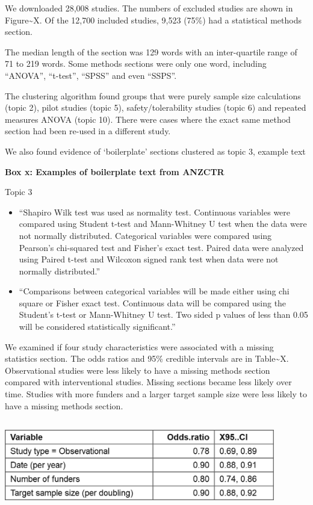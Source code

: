 \documentclass[12pt]{article}
\providecommand{\tightlist}{%
  \setlength{\itemsep}{0pt}\setlength{\parskip}{0pt}}
\begin{document}
We downloaded 28,008 studies. The numbers of excluded studies are shown
in Figure\textasciitilde X. Of the 12,700 included studies, 9,523 (75\%)
had a statistical methods section.

The median length of the section was 129 words with an inter-quartile
range of 71 to 219 words. Some methods sections were only one word,
including ``ANOVA'', ``t-test'', ``SPSS'' and even ``SSPS''.

The clustering algorithm found groups that were purely sample size
calculations (topic 2), pilot studies (topic 5), safety/tolerability
studies (topic 6) and repeated measures ANOVA (topic 10). There were
cases where the exact same method section had been re-used in a
different study.

We also found evidence of `boilerplate' sections clustered as topic 3,
example text

\textbf{Box x: Examples of boilerplate text from ANZCTR}

Topic 3

\begin{itemize}
\tightlist
\item
  ``Shapiro Wilk test was used as normality test. Continuous variables
  were compared using Student t-test and Mann-Whitney U test when the
  data were not normally distributed. Categorical variables were
  compared using Pearson's chi-squared test and Fisher's exact test.
  Paired data were analyzed using Paired t-test and Wilcoxon signed rank
  test when data were not normally distributed.''
\item
  ``Comparisons between categorical variables will be made either using
  chi square or Fisher exact test. Continuous data will be compared
  using the Student's t-test or Mann-Whitney U test. Two sided p values
  of less than 0.05 will be considered statistically significant.''
\end{itemize}

We examined if four study characteristics were associated with a missing
statistics section. The odds ratios and 95\% credible intervals are in
Table\textasciitilde X. Observational studies were less likely to have a
missing methods section compared with interventional studies. Missing
sections became less likely over time. Studies with more funders and a
larger target sample size were less likely to have a missing methods
section.

\includegraphics[width=4.66in,height=1.55in,keepaspectratio]{asa_template_files/figure-latex/unnamed-chunk-9-1.png}
\end{document}
